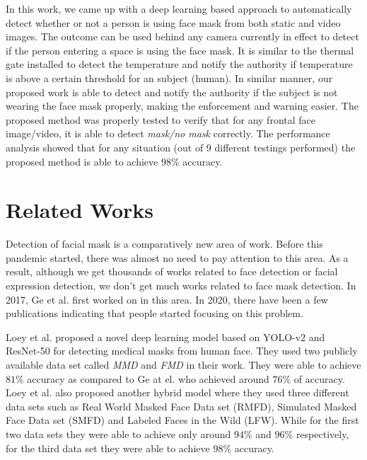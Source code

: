 \documentclass{svproc}
\begin{document}
In this work, we came up with a deep learning based approach to automatically detect whether or not a person is using face mask from both static and video images. The outcome can be used behind any camera currently in effect to detect if the person entering a space is using the face mask. It is similar to the thermal gate installed to detect the temperature and notify the authority if temperature is above a certain threshold for an subject (human). In similar manner, our proposed work is able to detect and notify the authority if the subject is not wearing the face mask properly, making the enforcement and warning easier. The proposed method was properly tested to verify that for any frontal face image/video, it is able to detect \emph{mask/no mask} correctly. The performance analysis showed that for any situation (out of 9 different testings performed) the proposed method is able to achieve $98\%$ accuracy.   

\section{Related Works}

Detection of facial mask is a comparatively new area of work. Before this pandemic started, there was almost no need to pay attention to this area. As a result, although we get thousands of works related to face detection or facial expression detection, we don't get much works related to face mask detection. In 2017, Ge et al. \cite{ge2017detecting} first worked on in this area.  In 2020, there have been a few publications indicating that people started focusing on this problem. \\

\par Loey et al. \cite{loey2020fighting} proposed a novel deep learning model based on YOLO-v2 and ResNet-50 for detecting medical masks from human face. They used two publicly available data set called \emph{MMD} and \emph{FMD} in their work. They were able to achieve $81\%$ accuracy as compared to Ge at el. who achieved around $76\%$ of accuracy. Loey et al. also proposed another hybrid model \cite{loey2020hybrid} where they used three different data sets such as Real World Masked Face Data set (RMFD), Simulated Masked Face Data set (SMFD) and Labeled Faces in the Wild (LFW). While for the first two data sets they were able to achieve only around $94\%$ and $96\%$ respectively, for the third data set they were able to achieve $98\%$ accuracy. \\
\end{document}
